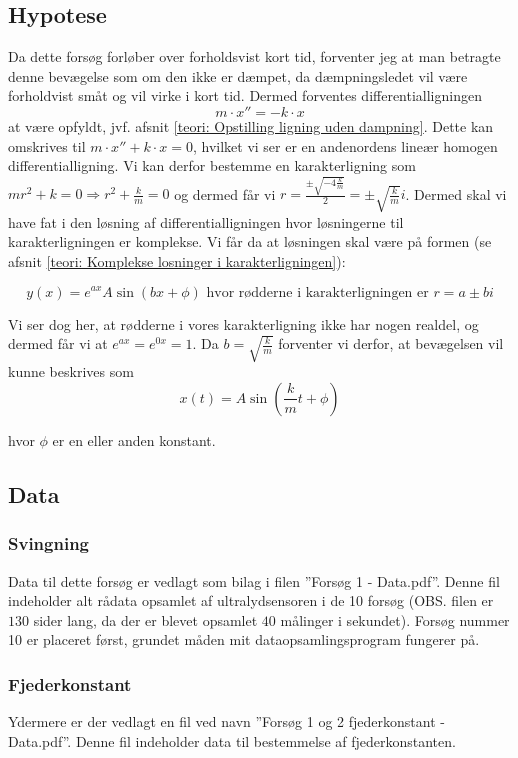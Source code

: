 \subsection{Hypotese}\label{exp1: Hypotese}
Da dette forsøg forløber over forholdsvist kort tid, forventer jeg at man betragte denne bevægelse som om den ikke er dæmpet, da dæmpningsledet vil være forholdvist småt og vil virke i kort tid. 
Dermed forventes differentialligningen 
$$m\cdot x'' = -k \cdot x$$
at være opfyldt, jvf. afsnit \ref{teori: Opstilling ligning uden dampning}.
Dette kan omskrives til $m\cdot x'' + k\cdot x=0$, hvilket vi ser er en andenordens lineær homogen differentialligning. 
Vi kan derfor bestemme en karakterligning som $mr^2 + k = 0 \Rightarrow r^2 + \frac{k}{m} = 0$ og dermed får vi $r = \frac{\pm \sqrt{-4\frac{k}{m}}}{2}=\pm\sqrt{\frac{k}{m}}i$.
Dermed skal vi have fat i den løsning af differentialligningen hvor løsningerne til karakterligningen er komplekse. 
Vi får da at løsningen skal være på formen (se afsnit \ref{teori: Komplekse losninger i karakterligningen}):

$$y(x) = e^{ax}A\sin(bx+\phi) \text{ hvor rødderne i karakterligningen er } r = a \pm bi$$

Vi ser dog her, at rødderne i vores karakterligning ikke har nogen realdel, og dermed får vi at $e^{ax}=e^{0x}=1$.
Da $b=\sqrt{\frac{k}{m}}$ forventer vi derfor, at bevægelsen vil kunne beskrives som 
\begin{equation}
x(t)=A\sin (\frac{k}{m}t+\phi)
\label{eq: exp1 hypotese}
\end{equation}

hvor $\phi$ er en eller anden konstant. 


\subsection{Data}\label{exp1: Data}
\subsubsection{Svingning}
Data til dette forsøg er vedlagt som bilag i filen ''Forsøg 1 - Data.pdf''.
Denne fil indeholder alt rådata opsamlet af ultralydsensoren i de 10 forsøg (OBS. filen er $130$ sider lang, da der er blevet opsamlet $40$ målinger i sekundet). 
Forsøg nummer 10 er placeret først, grundet måden mit dataopsamlingsprogram fungerer på.

\subsubsection{Fjederkonstant}\label{exp1: Fjederkonstant}
Ydermere er der vedlagt en fil ved navn ''Forsøg 1 og 2 fjederkonstant - Data.pdf''.
Denne fil indeholder data til bestemmelse af fjederkonstanten. 

